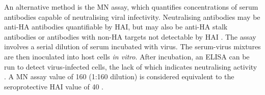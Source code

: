 An alternative method is the \gls{MN} assay, which quantifies concentrations of serum antibodies capable of neutralising viral infectivity.
Neutralising antibodies may be anti-\gls{HA} antibodies quantifiable by \gls{HAI}, but may also be anti-\gls{HA} stalk antibodies or antibodies with non-\gls{HA} targets not detectable by \gls{HAI} \autocite{krammer2019HumanAntibodyResponse}.
The assay involves a serial dilution of serum incubated with virus. 
The serum-virus mixtures are then inoculated into host cells \textit{in vitro}.
After incubation, an \gls{ELISA} can be run to detect virus-infected cells, the lack of which indicates neutralising activity \autocite{klimov2012InfluenzaVirusTitration}.
A \gls{MN} assay value of 160 (1:160 dilution) is considered equivalent to the seroprotective \gls{HAI} value of 40 \autocite{bresee2018InactivatedInfluenzaVaccines}.

